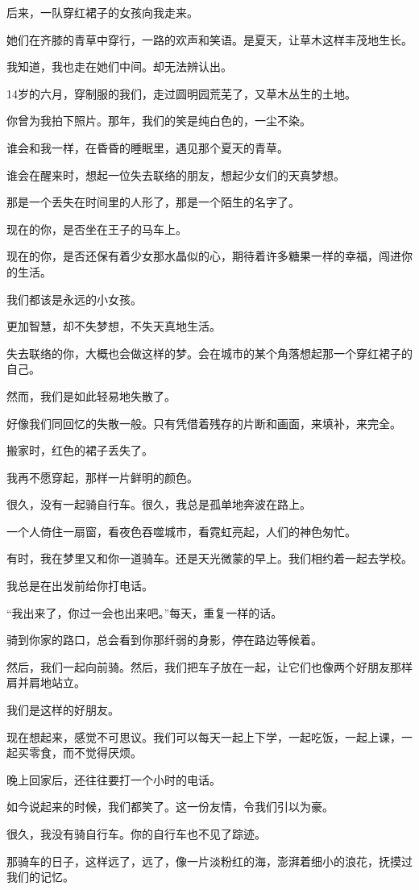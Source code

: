\documentclass[12pt,a4paper]{article}
\begin{document}
		后来，一队穿红裙子的女孩向我走来。\par
		她们在齐膝的青草中穿行，一路的欢声和笑语。是夏天，让草木这样丰茂地生长。\par
		我知道，我也走在她们中间。却无法辨认出。\par
		14岁的六月，穿制服的我们，走过圆明园荒芜了，又草木丛生的土地。\par
		你曾为我拍下照片。那年，我们的笑是纯白色的，一尘不染。\par
		谁会和我一样，在昏昏的睡眠里，遇见那个夏天的青草。\par
		谁会在醒来时，想起一位失去联络的朋友，想起少女们的天真梦想。\par
		那是一个丢失在时间里的人形了，那是一个陌生的名字了。\par
		现在的你，是否坐在王子的马车上。\par
		现在的你，是否还保有着少女那水晶似的心，期待着许多糖果一样的幸福，闯进你的生活。\par
		我们都该是永远的小女孩。\par
		更加智慧，却不失梦想，不失天真地生活。\par
		失去联络的你，大概也会做这样的梦。会在城市的某个角落想起那一个穿红裙子的自己。\par
		然而，我们是如此轻易地失散了。\par
		好像我们同回忆的失散一般。只有凭借着残存的片断和画面，来填补，来完全。\par
		搬家时，红色的裙子丢失了。\par
		我再不愿穿起，那样一片鲜明的颜色。

		很久，没有一起骑自行车。很久，我总是孤单地奔波在路上。\par
		一个人倚住一扇窗，看夜色吞噬城市，看霓虹亮起，人们的神色匆忙。\par
		有时，我在梦里又和你一道骑车。还是天光微蒙的早上。我们相约着一起去学校。\par
		我总是在出发前给你打电话。\par
		“我出来了，你过一会也出来吧。”每天，重复一样的话。\par
		骑到你家的路口，总会看到你那纤弱的身影，停在路边等候着。\par
		然后，我们一起向前骑。然后，我们把车子放在一起，让它们也像两个好朋友那样肩并肩地站立。\par
		我们是这样的好朋友。\par
		现在想起来，感觉不可思议。我们可以每天一起上下学，一起吃饭，一起上课，一起买零食，而不觉得厌烦。\par
		晚上回家后，还往往要打一个小时的电话。\par
		如今说起来的时候，我们都笑了。这一份友情，令我们引以为豪。\par
		很久，我没有骑自行车。你的自行车也不见了踪迹。\par
		那骑车的日子，这样远了，远了，像一片淡粉红的海，澎湃着细小的浪花，抚摸过我们的记忆。
\end{document}
